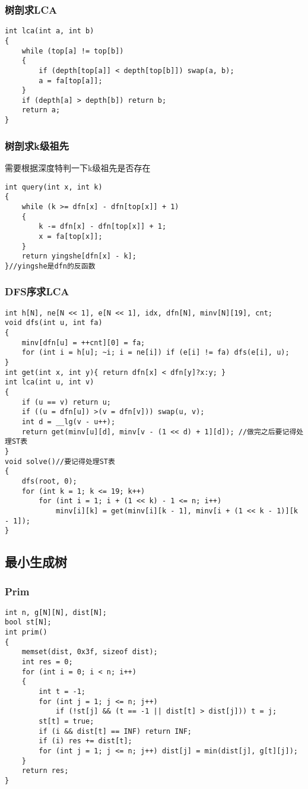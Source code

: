 \documentclass[a4paper, fontset=none]{ctexart}
\begin{document}
\subsubsection{树剖求LCA}
\begin{verbatim}
int lca(int a, int b)
{
    while (top[a] != top[b])
    {
        if (depth[top[a]] < depth[top[b]]) swap(a, b);
        a = fa[top[a]];
    }
    if (depth[a] > depth[b]) return b;
    return a;
}
\end{verbatim}
\subsubsection{树剖求k级祖先}
需要根据深度特判一下k级祖先是否存在
\begin{verbatim}
int query(int x, int k)
{
    while (k >= dfn[x] - dfn[top[x]] + 1)
    {
        k -= dfn[x] - dfn[top[x]] + 1;
        x = fa[top[x]];
    }
    return yingshe[dfn[x] - k];
}//yingshe是dfn的反函数
\end{verbatim}
\subsubsection{DFS序求LCA}
\begin{verbatim}
int h[N], ne[N << 1], e[N << 1], idx, dfn[N], minv[N][19], cnt;
void dfs(int u, int fa)
{
    minv[dfn[u] = ++cnt][0] = fa;
    for (int i = h[u]; ~i; i = ne[i]) if (e[i] != fa) dfs(e[i], u);
}
int get(int x, int y){ return dfn[x] < dfn[y]?x:y; }
int lca(int u, int v)
{
    if (u == v) return u;
    if ((u = dfn[u]) >(v = dfn[v])) swap(u, v);
    int d = __lg(v - u++);
    return get(minv[u][d], minv[v - (1 << d) + 1][d]); //做完之后要记得处理ST表
}
void solve()//要记得处理ST表
{
    dfs(root, 0);
    for (int k = 1; k <= 19; k++)
        for (int i = 1; i + (1 << k) - 1 <= n; i++)
            minv[i][k] = get(minv[i][k - 1], minv[i + (1 << k - 1)][k - 1]);
}
\end{verbatim}
\subsection{最小生成树}
\subsubsection{Prim}
\begin{verbatim}
int n, g[N][N], dist[N];
bool st[N];
int prim()
{
    memset(dist, 0x3f, sizeof dist);
    int res = 0;
    for (int i = 0; i < n; i++)
    {
        int t = -1;
        for (int j = 1; j <= n; j++)
            if (!st[j] && (t == -1 || dist[t] > dist[j])) t = j;
        st[t] = true;
        if (i && dist[t] == INF) return INF;
        if (i) res += dist[t];
        for (int j = 1; j <= n; j++) dist[j] = min(dist[j], g[t][j]);
    }
    return res;
}
\end{verbatim}
\end{document}
